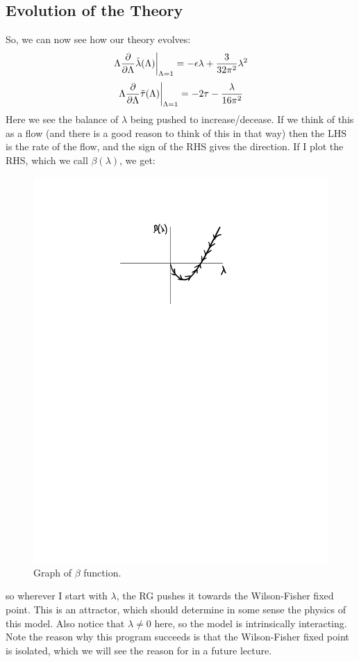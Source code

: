 \subsection{Evolution of the Theory}
So, we can now see how our theory evolves:
\begin{equation}
    \left.\Lambda\frac{\partial }{\partial \Lambda} \tilde{\lambda}(\Lambda)\right|_{\Lambda =1} = -\epsilon\lambda + \frac{3}{32\pi^2}\lambda^2
\end{equation}
\begin{equation}
    \left.\Lambda\frac{\partial }{\partial \Lambda} \tilde{\tau}(\Lambda)\right|_{\Lambda =1} = -2\tau - \frac{\lambda}{16\pi^2}
\end{equation}
Here we see the balance of $\lambda$ being pushed to increase/decease. If we think of this as a flow (and there is a good reason to think of this in that way) then the LHS is the rate of the flow, and the sign of the RHS gives the direction. If I plot the RHS, which we call $\beta(\lambda)$, we get:
\begin{figure}[htbp]
    \centering
    \includegraphics[scale=0.7]{Images/fig-betaplot2.pdf}
    \caption{Graph of $\beta$ function.}
    \label{fig-betaplot2}
\end{figure}
so wherever I start with $\lambda$, the RG pushes it towards the Wilson-Fisher fixed point. This is an attractor, which should determine in some sense the physics of this model. Also notice that $\lambda \neq 0$ here, so the model is intrinsically interacting. Note the reason why this program succeeds is that the Wilson-Fisher fixed point is isolated, which we will see the reason for in a future lecture.

